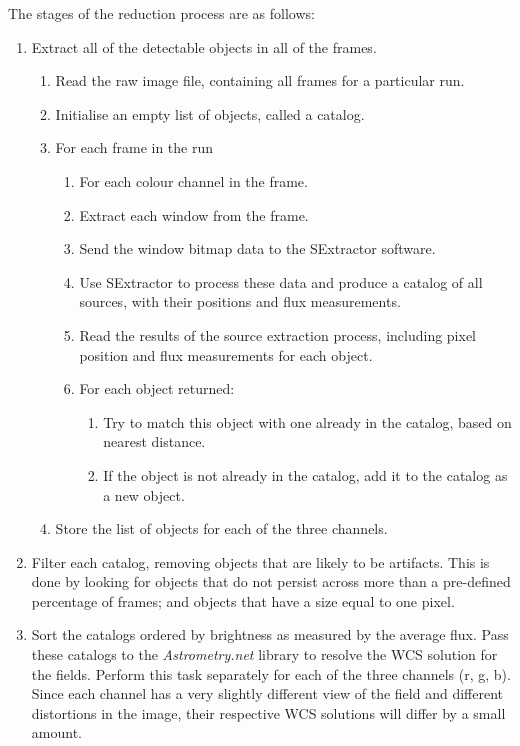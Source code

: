 The stages of the reduction process are as follows:
\begin{enumerate}
	\item Extract all of the detectable objects in all of the frames. 
	\begin{enumerate}
		\item Read the raw image file, containing all frames for a particular run.
		\item Initialise an empty list of objects, called a catalog.
		\item For each frame in the run
		\begin{enumerate}
			\item For each colour channel in the frame.
			\item Extract each window from the frame.
			\item Send the window bitmap data to the SExtractor software.
			\item Use SExtractor to process these data and produce a catalog of all sources, with their positions and flux measurements.
			\item Read the results of the source extraction process, including pixel position and flux measurements for each object.
			\item For each object returned:
			\begin{enumerate} 
				\item Try to match this object with one already in the catalog, based on nearest distance.
				\item If the object is not already in the catalog, add it to the catalog as a new object.
			\end{enumerate}
		\end{enumerate}
		\item Store the list of objects for each of the three channels.
	\end{enumerate}
	\item Filter each catalog, removing objects that are likely to be artifacts. This is done by looking for objects that do not persist across more than a pre-defined percentage of frames; and objects that have a size equal to one pixel. 
	\item Sort the catalogs ordered by brightness as measured by the average flux. Pass these catalogs to the \emph{Astrometry.net} library to resolve the WCS solution for the fields. Perform this task separately for each of the three channels (r, g, b). Since each channel has a very slightly different view of the field and different distortions in the image, their respective WCS solutions will differ by a small amount.

\end{enumerate}
